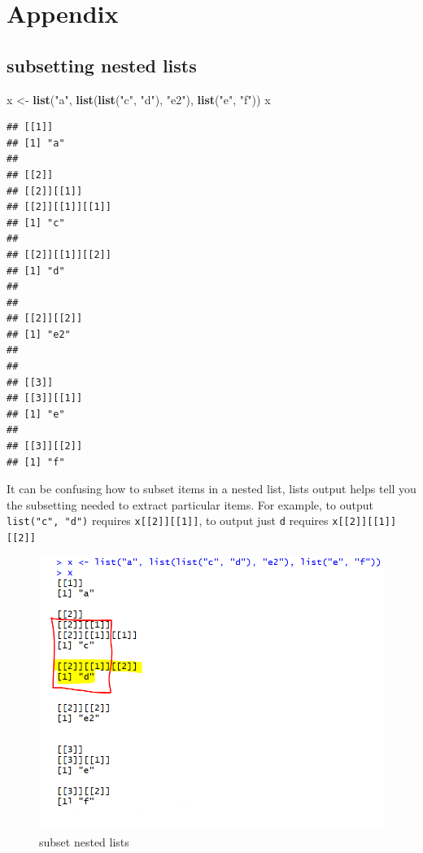 \documentclass[]{book}
\newenvironment{Shaded}{\begin{snugshade}}{\end{snugshade}}
\newcommand{\KeywordTok}[1]{\textcolor[rgb]{0.13,0.29,0.53}{\textbf{#1}}}
\newcommand{\NormalTok}[1]{#1}
\newcommand{\StringTok}[1]{\textcolor[rgb]{0.31,0.60,0.02}{#1}}
\theoremstyle{definition}
\theoremstyle{definition}
\theoremstyle{definition}
\theoremstyle{remark}
\begin{document}
\hypertarget{appendix-6}{%
\chapter{Appendix}\label{appendix-6}}

\hypertarget{subsetting-nested-lists}{%
\section{subsetting nested lists}\label{subsetting-nested-lists}}

\begin{Shaded}
\begin{Highlighting}[]
\NormalTok{x <-}\StringTok{ }\KeywordTok{list}\NormalTok{(}\StringTok{"a"}\NormalTok{, }\KeywordTok{list}\NormalTok{(}\KeywordTok{list}\NormalTok{(}\StringTok{"c"}\NormalTok{, }\StringTok{"d"}\NormalTok{), }\StringTok{"e2"}\NormalTok{), }\KeywordTok{list}\NormalTok{(}\StringTok{"e"}\NormalTok{, }\StringTok{"f"}\NormalTok{))}
\NormalTok{x}
\end{Highlighting}
\end{Shaded}

\begin{verbatim}
## [[1]]
## [1] "a"
## 
## [[2]]
## [[2]][[1]]
## [[2]][[1]][[1]]
## [1] "c"
## 
## [[2]][[1]][[2]]
## [1] "d"
## 
## 
## [[2]][[2]]
## [1] "e2"
## 
## 
## [[3]]
## [[3]][[1]]
## [1] "e"
## 
## [[3]][[2]]
## [1] "f"
\end{verbatim}

It can be confusing how to subset items in a nested list, lists output
helps tell you the subsetting needed to extract particular items. For
example, to output \texttt{list("c",\ "d")} requires
\texttt{x{[}{[}2{]}{]}{[}{[}1{]}{]}}, to output just \texttt{d} requires
\texttt{x{[}{[}2{]}{]}{[}{[}1{]}{]}{[}{[}2{]}{]}}

\begin{figure}
\centering
\includegraphics{subsetting-lists-note.png}
\caption{subset nested lists}
\end{figure}
\end{document}
